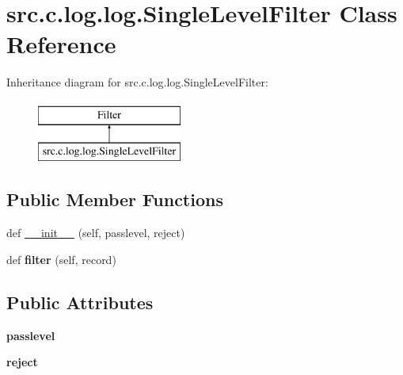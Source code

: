 \hypertarget{classsrc_1_1c_1_1log_1_1log_1_1_single_level_filter}{}\section{src.\+c.\+log.\+log.\+Single\+Level\+Filter Class Reference}
\label{classsrc_1_1c_1_1log_1_1log_1_1_single_level_filter}
Inheritance diagram for src.\+c.\+log.\+log.\+Single\+Level\+Filter\+:\begin{figure}[H]
\begin{center}
\leavevmode
\includegraphics[height=2.000000cm]{classsrc_1_1c_1_1log_1_1log_1_1_single_level_filter}
\end{center}
\end{figure}
\subsection*{Public Member Functions}
\begin{DoxyCompactItemize}
\item 
def \hyperlink{classsrc_1_1c_1_1log_1_1log_1_1_single_level_filter_a27fc4a7a15ce94ab4dc8532e9a303220}{\+\_\+\+\_\+init\+\_\+\+\_\+} (self, passlevel, reject)
\item 
\hypertarget{classsrc_1_1c_1_1log_1_1log_1_1_single_level_filter_acff07f806ac9593d9018966b75c1b189}{}def {\bfseries filter} (self, record)\label{classsrc_1_1c_1_1log_1_1log_1_1_single_level_filter_acff07f806ac9593d9018966b75c1b189}

\end{DoxyCompactItemize}
\subsection*{Public Attributes}
\begin{DoxyCompactItemize}
\item 
\hypertarget{classsrc_1_1c_1_1log_1_1log_1_1_single_level_filter_a1c4fd18b2224c93790ee88a481ccafa8}{}{\bfseries passlevel}\label{classsrc_1_1c_1_1log_1_1log_1_1_single_level_filter_a1c4fd18b2224c93790ee88a481ccafa8}

\item 
\hypertarget{classsrc_1_1c_1_1log_1_1log_1_1_single_level_filter_a2e26d27212b60d3b7753ce929594446f}{}{\bfseries reject}\label{classsrc_1_1c_1_1log_1_1log_1_1_single_level_filter_a2e26d27212b60d3b7753ce929594446f}

\end{DoxyCompactItemize}


